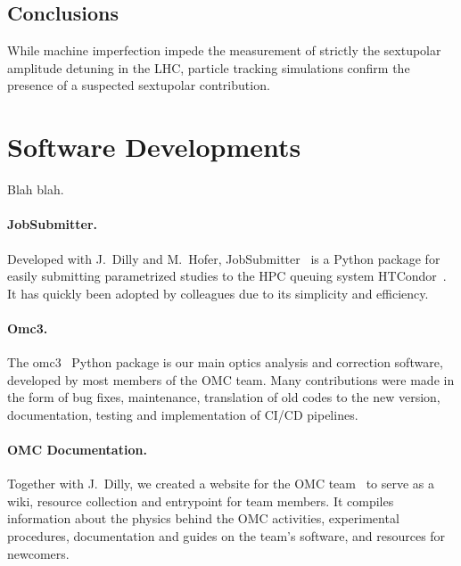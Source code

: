 
\subsection*{Conclusions}

While machine imperfection impede the measurement of strictly the sextupolar amplitude detuning in the LHC, particle tracking simulations confirm the presence of a suspected sextupolar contribution.

\section{Software Developments}

\newcommand{\ilparagraph}[1]{\paragraph{\bfseries #1\textcolor{cern}{.}}}

Blah blah.

\ilparagraph{JobSubmitter}
Developed with J.~Dilly and M.~Hofer, JobSubmitter~\cite{CODE:OMC:pylhc_submitter} is a Python package for easily submitting parametrized studies to the HPC queuing system HTCondor~\cite{CODE:Douglas:condor-practice}.
It has quickly been adopted by colleagues due to its simplicity and efficiency.

\ilparagraph{Omc3}
The omc3~\cite{CODE:OMC:omc3} Python package is our main optics analysis and correction software, developed by most members of the OMC team.
Many contributions were made in the form of bug fixes, maintenance, translation of old codes to the new version, documentation, testing and implementation of CI/CD pipelines.

\ilparagraph{OMC Documentation}
Together with J.~Dilly, we created a website for the OMC team~\cite{Website:OMC_Documentation} to serve as a wiki, resource collection and entrypoint for team members.
It compiles information about the physics behind the OMC activities, experimental procedures, documentation and guides on the team's software, and resources for newcomers.

